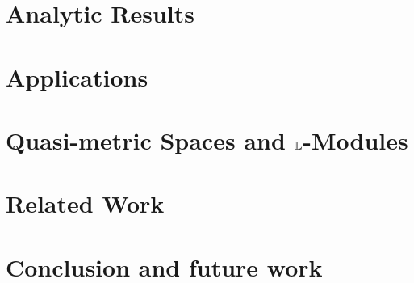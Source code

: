 \documentclass[conference]{IEEEtran}
\begin{document}
\section{Analytic Results}
%


\section{Applications}
%


\section{Quasi-metric Spaces and $\mathbb{L}$-Modules}
%


\section{Related Work}



\section{Conclusion and future work}

\end{document}
